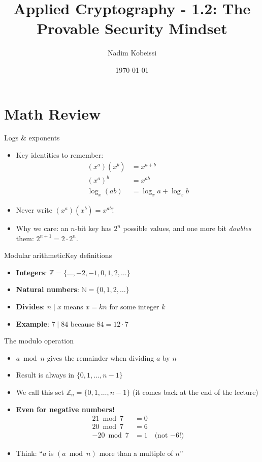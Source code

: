 \ifdefined\PRESENTATION\else\PassOptionsToClass{handout}{beamer}\fi\documentclass[aspectratio=169, lualatex]{beamer}
\title{Applied Cryptography - 1.2: The Provable Security Mindset}
\author{Nadim Kobeissi}
\institute{Symbolic Software}
\date{\today}
\begin{document}
\begin{frame}[plain]
	\titlepage
\end{frame}

\section{Math Review}

\begin{frame}{Logs \& exponents}
	\begin{itemize}[<+->]
		\item Key identities to remember:
		      \begin{align*}
			      (x^a)(x^b) & = x^{a+b}             \\
			      (x^a)^b    & = x^{ab}              \\
			      \log_x(ab) & = \log_x a + \log_x b
		      \end{align*}
		\item \alert{Never write $(x^a)(x^b) = x^{ab}$!}
		\item Why we care: an $n$-bit key has $2^n$ possible values, and one more bit \emph{doubles} them: $2^{n+1} = 2 \cdot 2^n$.
	\end{itemize}
\end{frame}

\begin{frame}{Modular arithmetic}{Key definitions}
	\begin{itemize}[<+->]
		\item \textbf{Integers}: $\mathbb{Z} = \{\ldots, -2, -1, 0, 1, 2, \ldots\}$
		\item \textbf{Natural numbers}: $\mathbb{N} = \{0, 1, 2, \ldots\}$
		\item \textbf{Divides}: $n \mid x$ means $x = kn$ for some integer $k$
		\item \textbf{Example}: $7 \mid 84$ because $84 = 12 \cdot 7$
	\end{itemize}
\end{frame}

\begin{frame}{The modulo operation}
	\begin{itemize}[<+->]
		\item $a \bmod n$ gives the remainder when dividing $a$ by $n$
		\item Result is always in $\{0, 1, \ldots, n-1\}$
		\item We call this set $\mathbb{Z}_n = \{0, 1, \ldots, n-1\}$ (it comes back at the end of the lecture)
		\item \textbf{Even for negative numbers!}
		      \begin{align*}
			      21 \bmod 7  & = 0                          \\
			      20 \bmod 7  & = 6                          \\
			      -20 \bmod 7 & = 1 \quad \text{(not $-6$!)}
		      \end{align*}
		\item Think: ``$a$ is $(a \bmod n)$ more than a multiple of $n$''
	\end{itemize}
\end{frame}
\end{document}

